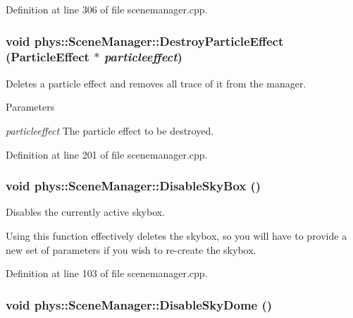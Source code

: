 Definition at line 306 of file scenemanager.cpp.

\hypertarget{classphys_1_1SceneManager_addce8f82a6758db345568dbd4a88f5b9}{
\subsubsection[{DestroyParticleEffect}]{\setlength{\rightskip}{0pt plus 5cm}void phys::SceneManager::DestroyParticleEffect ({\bf ParticleEffect} $\ast$ {\em particleeffect})}}
\label{dd/da8/classphys_1_1SceneManager_addce8f82a6758db345568dbd4a88f5b9}


Deletes a particle effect and removes all trace of it from the manager. 


\begin{DoxyParams}{Parameters}
\item[{\em particleeffect}]The particle effect to be destroyed. \end{DoxyParams}


Definition at line 201 of file scenemanager.cpp.

\hypertarget{classphys_1_1SceneManager_acb9c87d510955f028db24ce49944a97a}{
\subsubsection[{DisableSkyBox}]{\setlength{\rightskip}{0pt plus 5cm}void phys::SceneManager::DisableSkyBox ()}}
\label{dd/da8/classphys_1_1SceneManager_acb9c87d510955f028db24ce49944a97a}


Disables the currently active skybox. 

Using this function effectively deletes the skybox, so you will have to provide a new set of parameters if you wish to re-\/create the skybox. 

Definition at line 103 of file scenemanager.cpp.

\hypertarget{classphys_1_1SceneManager_a11bf15ca8c7d758ee50e423ad03d2625}{
\subsubsection[{DisableSkyDome}]{\setlength{\rightskip}{0pt plus 5cm}void phys::SceneManager::DisableSkyDome ()}}
\label{dd/da8/classphys_1_1SceneManager_a11bf15ca8c7d758ee50e423ad03d2625}



